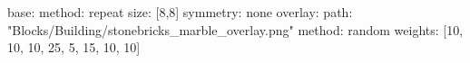 base:
  method: repeat
  size: [8,8]
  symmetry: none
overlay:
  path: "Blocks/Building/stonebricks_marble_overlay.png"
  method: random
  weights: [10, 10, 10, 25, 5, 15, 10, 10]